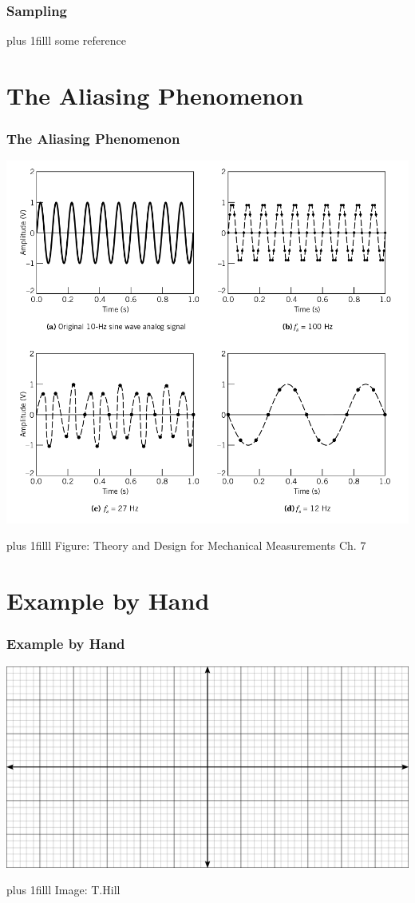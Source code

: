 \documentclass[fleqn]{beamer} %
\newcommand{\sectiontitleI}{Sampling}
\newcommand{\sectiontitleII}{The Aliasing Phenomenon}
\newcommand{\sectiontitleIII}{Example by Hand}
\newcommand{\btVFill}{\vskip0pt plus 1filll}
\begin{document}
	\begin{frame}[label=sectionI] \small
	\frametitle{\sectiontitleI}
	

	\btVFill
	\tiny{some reference}
\end{frame}

\section{\sectiontitleII}	

\begin{frame}[label=sectionII] \small
\frametitle{\sectiontitleII}
\bigskip
\includegraphics[scale=.2]{aliasing_fig7_2.png}


\btVFill
\tiny{Figure: Theory and Design for Mechanical Measurements Ch. 7}		

\end{frame}
	
\section{\sectiontitleIII}	

\begin{frame}[label=sectionIII] \small
\frametitle{\sectiontitleIII}
\bigskip
\includegraphics[scale=.35]{cartesian_6x12.png}


\btVFill
\tiny{Image: T.Hill}		

\end{frame}
\end{document}
